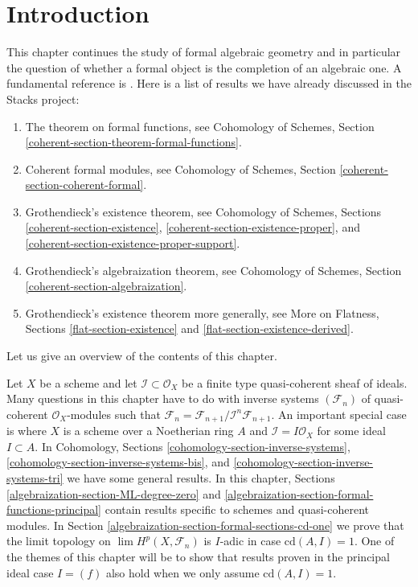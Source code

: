 \section{Introduction}
\label{algebraization-section-introduction}
This chapter continues the study of formal algebraic geometry
and in particular the question of whether a formal object is
the completion of an algebraic one. A fundamental reference is \cite{SGA2}.
Here is a list of results we have already discussed
in the Stacks project:
\begin{enumerate}
\item The theorem on formal functions, see
Cohomology of Schemes, Section \ref{coherent-section-theorem-formal-functions}.
\item Coherent formal modules, see
Cohomology of Schemes, Section \ref{coherent-section-coherent-formal}.
\item Grothendieck's existence theorem, see
Cohomology of Schemes, Sections \ref{coherent-section-existence},
\ref{coherent-section-existence-proper}, and
\ref{coherent-section-existence-proper-support}.
\item Grothendieck's algebraization theorem, see
Cohomology of Schemes, Section \ref{coherent-section-algebraization}.
\item Grothendieck's existence theorem more generally, see
More on Flatness, Sections \ref{flat-section-existence} and
\ref{flat-section-existence-derived}.
\end{enumerate}
Let us give an overview of the contents of this chapter.

\medskip\noindent
Let $X$ be a scheme and let $\mathcal{I} \subset \mathcal{O}_X$
be a finite type quasi-coherent sheaf of ideals. Many questions
in this chapter have to do with inverse systems $(\mathcal{F}_n)$
of quasi-coherent $\mathcal{O}_X$-modules such that
$\mathcal{F}_n = \mathcal{F}_{n + 1}/\mathcal{I}^n\mathcal{F}_{n + 1}$.
An important special case is where $X$ is a scheme over a Noetherian
ring $A$ and $\mathcal{I} = I \mathcal{O}_X$ for some ideal $I \subset A$.
In Cohomology, Sections \ref{cohomology-section-inverse-systems},
\ref{cohomology-section-inverse-systems-bis}, and
\ref{cohomology-section-inverse-systems-tri} we have some general
results. In this chapter, Sections \ref{algebraization-section-ML-degree-zero} and
\ref{algebraization-section-formal-functions-principal} contain results specific
to schemes and quasi-coherent modules. In
Section \ref{algebraization-section-formal-sections-cd-one} we prove
that the limit topology on $\lim H^p(X, \mathcal{F}_n)$ is $I$-adic
in case $\text{cd}(A, I) = 1$. One of the themes
of this chapter will be to show that results proven in the
principal ideal case $I = (f)$
also hold when we only assume $\text{cd}(A, I) = 1$.

